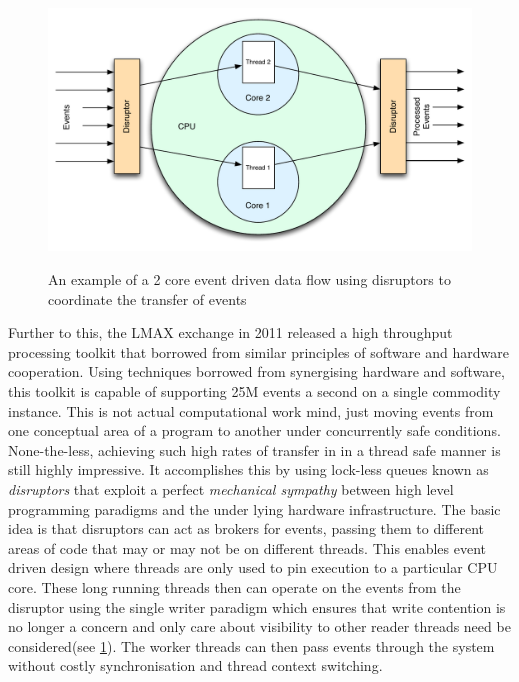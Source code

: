 \documentclass[a4paper,11pt]{scrreprt}
\begin{document}
\begin{figure}[h!]

\centering
\caption{An example of a 2 core event driven data flow using disruptors to coordinate the transfer of events}
\includegraphics[scale=0.65] {disruptor-ex.pdf}
\label{fig:disruptor-ex}
\end{figure}

Further to this, the LMAX exchange in 2011 released a high throughput processing toolkit that borrowed from similar principles of software and hardware cooperation. Using techniques borrowed from synergising hardware and software, this toolkit is capable of supporting 25M events a second on a single commodity instance\cite{disruptor-paper}. This is not actual computational work mind, just moving events from one conceptual area of a program to another under concurrently safe conditions. None-the-less, achieving such high rates of transfer in in a thread safe manner is still highly impressive. It accomplishes this by using lock-less queues known as \textit{disruptors} that exploit a perfect \textit{mechanical sympathy} between high level programming paradigms and the under lying hardware infrastructure. The basic idea is that disruptors can act as brokers for events, passing them to different areas of code that may or may not be on different threads. This enables event driven design where threads are only used to pin execution to a particular CPU core\cite{processor-affinity}. These long running threads then can operate on the events from the disruptor using the single writer paradigm which ensures that write contention is no longer a concern and only care about visibility to other reader threads need be considered(see \ref{fig:disruptor-ex}). The worker threads can then pass events through the system without costly synchronisation and thread context switching.
\end{document}
